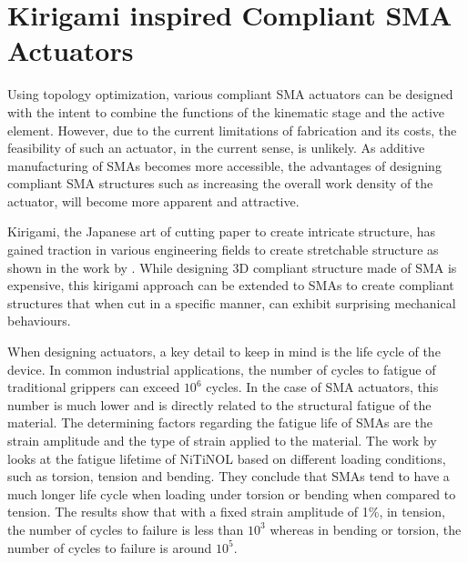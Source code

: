
\section{Kirigami inspired Compliant SMA Actuators}
Using topology optimization, various compliant SMA actuators can be designed with the intent to combine the functions of the kinematic stage and the active element. However, due to the current limitations of fabrication and its costs, the feasibility of such an actuator, in the current sense, is unlikely. As additive manufacturing of SMAs becomes more accessible, the advantages of designing compliant SMA structures such as increasing the overall work density of the actuator, will become more apparent and attractive.

Kirigami, the Japanese art of cutting paper to create intricate structure, has gained traction in various engineering fields to create stretchable structure as shown in the work by \todocite. While designing 3D compliant structure made of SMA is expensive, this kirigami approach can be extended to SMAs to create compliant structures that when cut in a specific manner, can exhibit surprising mechanical behaviours.

When designing actuators, a key detail to keep in mind is the life cycle of the device. In common industrial applications, the number of cycles to fatigue of traditional grippers can exceed $10^6$ cycles. In the case of SMA actuators, this number is much lower and is directly related to the structural fatigue of the material. The determining factors regarding the fatigue life of SMAs are the strain amplitude and the type of strain applied to the material. The work by \cite{runcimanEquivalentStrainCoffin2011} looks at the fatigue lifetime of NiTiNOL based on different loading conditions, such as torsion, tension and bending. They conclude that SMAs tend to have a much longer life cycle when loading under torsion or bending when compared to tension. The results show that with a fixed strain amplitude of 1\%, in tension, the number of cycles to failure is less than $10^3$ whereas in bending or torsion, the number of cycles to failure is around $10^5$.

